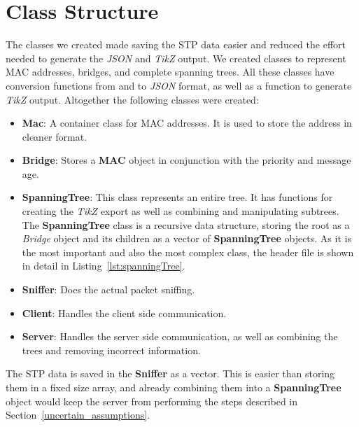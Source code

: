 \section{Class Structure}
\label{data}
The classes we created made saving the STP data easier and reduced the effort needed to generate the \textit{JSON} and \textit{TikZ} output.
We created classes to represent MAC addresses, bridges, and complete spanning trees.
All these classes have conversion functions from and to \textit{JSON} format, as well as a function to generate \textit{TikZ} output.
Altogether the following classes were created:
\begin{itemize}
    \item \textbf{Mac}: A container class for MAC addresses.
        It is used to store the address in cleaner format.
    \item \textbf{Bridge}: Stores a \textbf{MAC} object in conjunction with the priority and message age.
    \item \textbf{SpanningTree}: This class represents an entire tree.
        It has functions for creating the \textit{TikZ} export as well as combining and manipulating subtrees.
        The \textbf{SpanningTree} class is a recursive data structure, storing the root as a \textit{Bridge} object and its children as a vector of \textbf{SpanningTree} objects.
        As it is the most important and also the most complex class, the header file is shown in detail in Listing~\ref{lst:spanningTree}.
    \item \textbf{Sniffer}: Does the actual packet sniffing.
    \item \textbf{Client}: Handles the client side communication.
    \item \textbf{Server}: Handles the server side communication, as well as combining the trees and removing incorrect information.
\end{itemize}

The STP data is saved in the \textbf{Sniffer} as a vector.
This is easier than storing them in a fixed size array, and already combining them into a \textbf{SpanningTree} object would keep the server from performing the steps described in Section~\ref{uncertain_assumptions}.

